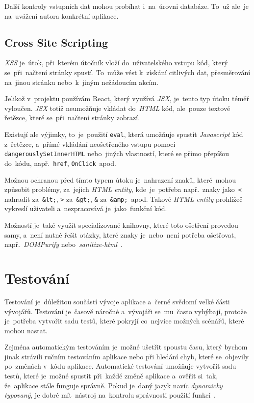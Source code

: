 \documentclass[11pt,a4paper]{report}
\begin{document}
                Další kontroly vstupních dat mohou probíhat i~na~úrovni databáze. To~už ale~je na~uvážení autora konkrétní aplikace. \cite{w3s:SQLInjection, itnetwork:SQLInjection}

            \subsection{Cross Site Scripting}
                \emph{XSS} je~útok, při~kterém útočník vloží do~uživatelského vstupu kód, který se~při~načtení stránky spustí. To~může vést k~získání citlivých dat, přesměrování na~jinou stránku nebo~k~jiným nežádoucím akcím.

                Jelikož v~projektu používám React, který využívá \emph{JSX}, je~tento typ útoku téměř vyloučen. \emph{JSX} totiž neumožňuje vkládat do~\emph{HTML} kód, ale~pouze textové řetězce, které se~při~načtení stránky zobrazí.

                Existují ale výjimky, to~je~použití \texttt{eval}, která umožňuje spustit \emph{Javascript} kód z~řetězce, a~přímé vkládání neošetřeného vstupu pomocí \texttt{dangerouslySetInnerHTML} nebo~jiných vlastností, které se přímo přepíšou do~kódu, např.~\texttt{href}, \texttt{OnClick}~apod.

                Možnou ochranou před tímto typem útoku je~nahrazení znaků, které~mohou způsobit problémy, za~jejich \emph{HTML entity}, kde~je~potřeba např.~znaky jako~\texttt{<} nahradit za~\texttt{\&lt;}, \texttt{>} za~\texttt{\&gt;}, \texttt{\&} za~\texttt{\&amp;}~apod. Takové \emph{HTML entity} prohlížeč vykreslí uživateli a~nezpracovává je~jako~funkční kód.
                
                Možností je~také využít specializované knihovny, které toto ošetření provedou samy, a~není nutné řešit otázky, které znaky je~nebo~není potřeba ošetřovat, např.~\emph{DOMPurify} nebo~\emph{sanitize-html}~\cite{medium:XSS}.

        \section{Testování}
            Testování je~důležitou součástí vývoje aplikace a~černé svědomí velké části vývojářů. Testování je~časově náročné a~vývojáři se~mu~často vyhýbají, protože je~potřeba vytvořit sadu testů, které pokryjí co~nejvíce možných scénářů, které mohou nastat.
            
            Zejména automatickým testováním je~možné ušetřit spoustu času, který bychom jinak strávili ručním testováním aplikace nebo při hledání chyb, které se~objevily po~změnách v~kódu aplikace. Automatické testování umožňuje vytvořit sadu testů, které je~možné spustit při~každé změně aplikace a~ověřit si~tak, že~aplikace stále funguje správně. Pokud je~daný jazyk navíc \emph{dynamicky typovaný}, je dobré mít~nástroj na~kontrolu správnosti použití funkcí~\cite{compilers, itnetworkBestPractices}.
            
\end{document}
